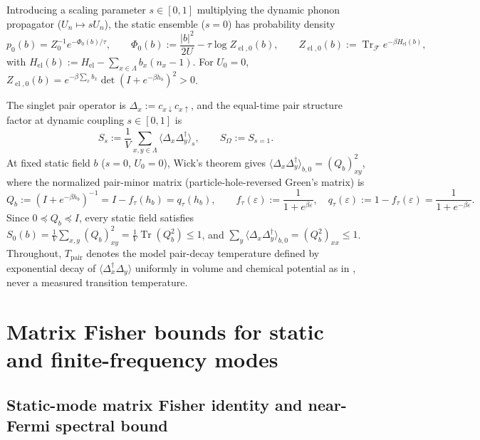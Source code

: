\documentclass[11pt]{article}
\theoremstyle{definition}
\theoremstyle{remark}
\DeclareMathOperator{\Tr}{Tr}
\DeclareMathOperator{\el}{el}
\newcommand{\Tpair}{T_{\mathrm{pair}}}
\begin{document}
Introducing a scaling parameter $s \in [0,1]$ multiplying the dynamic phonon propagator ($U_n \mapsto s U_n$), the static ensemble ($s=0$) has probability density
\begin{equation}
p_0(b) = Z_0^{-1} e^{-\Phi_0(b)/\tau}, \qquad \Phi_0(b) := \frac{|b|^2}{2U} - \tau \log Z_{\el,0}(b), \qquad Z_{\el,0}(b) := \Tr_{\mathcal{F}} e^{-\beta H_{\el}(b)},
\label{eq:p0}
\end{equation}
with $H_{\el}(b) := H_{\el} - \sum_{x\in\Lambda} b_x (n_x - 1)$. For $U_0 = 0$, $Z_{\el,0}(b) = e^{-\beta \sum_x b_x} \det(I + e^{-\beta h_b})^2 > 0$.

The singlet pair operator is $\Delta_x := c_{x\downarrow} c_{x\uparrow}$, and the equal-time pair structure factor at dynamic coupling $s \in [0,1]$ is
\begin{equation}
S_s := \frac{1}{V} \sum_{x,y \in \Lambda} \langle \Delta_x \Delta_y^\dagger \rangle_s, \qquad S_\Omega := S_{s=1}.
\label{eq:Ss}
\end{equation}
At fixed static field $b$ ($s = 0$, $U_0 = 0$), Wick's theorem gives $\langle \Delta_x \Delta_y^\dagger \rangle_{b,0} = (Q_b)_{xy}^2$, where the normalized pair-minor matrix (particle-hole-reversed Green's matrix) is
\begin{equation}
Q_b := (I + e^{-\beta h_b})^{-1} = I - f_\tau(h_b) = q_\tau(h_b), \qquad f_\tau(\varepsilon) := \frac{1}{1+e^{\beta\varepsilon}}, \quad q_\tau(\varepsilon) := 1 - f_\tau(\varepsilon) = \frac{1}{1+e^{-\beta\varepsilon}}.
\label{eq:Qb}
\end{equation}
Since $0 \preceq Q_b \preceq I$, every static field satisfies $S_0(b) = \frac{1}{V}\sum_{x,y}(Q_b)_{xy}^2 = \frac{1}{V}\Tr(Q_b^2) \le 1$, and $\sum_y \langle \Delta_x \Delta_y^\dagger\rangle_{b,0} = (Q_b^2)_{xx} \le 1$. Throughout, $\Tpair$ denotes the model pair-decay temperature defined by exponential decay of $\langle \Delta_x^\dagger \Delta_y \rangle$ uniformly in volume and chemical potential as in \cite{rens2026barriers2}, never a measured transition temperature.

\section{Matrix Fisher bounds for static and finite-frequency modes}
\label{sec:fisher}

\subsection{Static-mode matrix Fisher identity and near-Fermi spectral bound}
\end{document}

